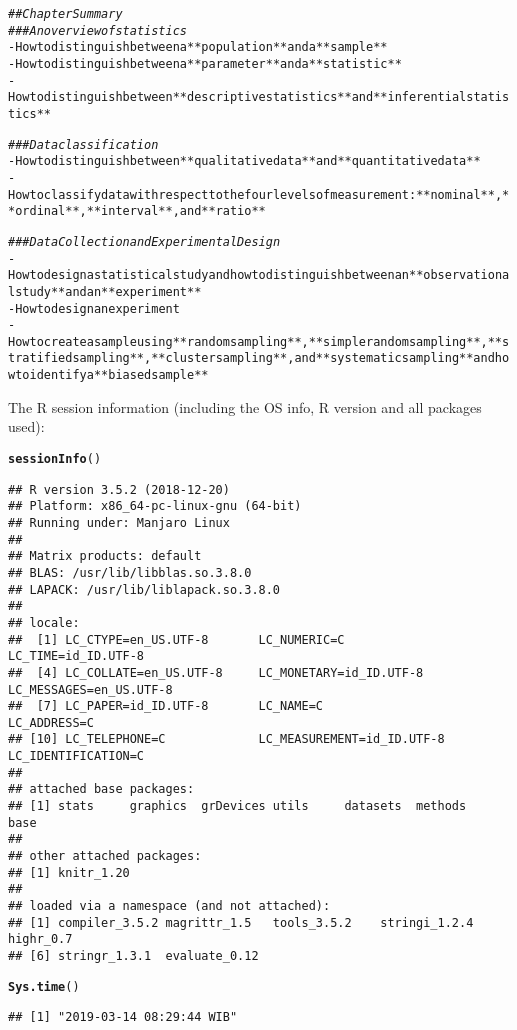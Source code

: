 \documentclass{article}\usepackage[]{graphicx}\usepackage[]{color}
\makeatletter
\newcommand{\hlcom}[1]{\textcolor[rgb]{0.678,0.584,0.686}{\textit{#1}}}%
\newcommand{\hlstd}[1]{\textcolor[rgb]{0.345,0.345,0.345}{#1}}%
\newcommand{\hlkwd}[1]{\textcolor[rgb]{0.737,0.353,0.396}{\textbf{#1}}}%
\newenvironment{kframe}{%
 \def\at@end@of@kframe{}%
 \ifinner\ifhmode%
  \def\at@end@of@kframe{\end{minipage}}%
  \begin{minipage}{\columnwidth}%
 \fi\fi%
 \def\FrameCommand##1{\hskip\@totalleftmargin \hskip-\fboxsep
 \colorbox{shadecolor}{##1}\hskip-\fboxsep
     \hskip-\linewidth \hskip-\@totalleftmargin \hskip\columnwidth}%
 \MakeFramed {\advance\hsize-\width
   \@totalleftmargin\z@ \linewidth\hsize
   \@setminipage}}%
 {\par\unskip\endMakeFramed%
 \at@end@of@kframe}
\newenvironment{knitrout}{}{} %
\makeatother
\begin{document}
\begin{knitrout}
\begin{kframe}
\begin{alltt}
\hlcom{## Chapter Summary}
\hlcom{### An overview of statistics}
- How to distinguish between a **population** and a **sample**
- How to distinguish between a **parameter** and a **statistic**
- How to distinguish between **descriptive statistics** and **inferential statistics**

\hlcom{### Data classification}
- How to distinguish between **qualitative data** and **quantitative data**
- How to classify data with respect to the four levels of measurement: **nominal**, **ordinal**, **interval**, and **ratio**

\hlcom{### Data Collection and Experimental Design}
- How to design a statistical study and how to distinguish between an **observational study** and an **experiment**
- How to design an experiment
- How to create a sample using **random sampling**, **simple random sampling**, **stratified sampling**, **cluster sampling**, and **systematic sampling** and how to identify a **biased sample**
\end{alltt}


{\ttfamily\noindent\bfseries{}}\end{kframe}
\end{knitrout}

The R session information (including the OS info, R version and all
packages used):

\begin{knitrout}
\color{fgcolor}\begin{kframe}
\begin{alltt}
\hlkwd{sessionInfo}\hlstd{()}
\end{alltt}
\begin{verbatim}
## R version 3.5.2 (2018-12-20)
## Platform: x86_64-pc-linux-gnu (64-bit)
## Running under: Manjaro Linux
## 
## Matrix products: default
## BLAS: /usr/lib/libblas.so.3.8.0
## LAPACK: /usr/lib/liblapack.so.3.8.0
## 
## locale:
##  [1] LC_CTYPE=en_US.UTF-8       LC_NUMERIC=C               LC_TIME=id_ID.UTF-8       
##  [4] LC_COLLATE=en_US.UTF-8     LC_MONETARY=id_ID.UTF-8    LC_MESSAGES=en_US.UTF-8   
##  [7] LC_PAPER=id_ID.UTF-8       LC_NAME=C                  LC_ADDRESS=C              
## [10] LC_TELEPHONE=C             LC_MEASUREMENT=id_ID.UTF-8 LC_IDENTIFICATION=C       
## 
## attached base packages:
## [1] stats     graphics  grDevices utils     datasets  methods   base     
## 
## other attached packages:
## [1] knitr_1.20
## 
## loaded via a namespace (and not attached):
## [1] compiler_3.5.2 magrittr_1.5   tools_3.5.2    stringi_1.2.4  highr_0.7     
## [6] stringr_1.3.1  evaluate_0.12
\end{verbatim}
\begin{alltt}
\hlkwd{Sys.time}\hlstd{()}
\end{alltt}
\begin{verbatim}
## [1] "2019-03-14 08:29:44 WIB"
\end{verbatim}
\end{kframe}
\end{knitrout}
\end{document}
